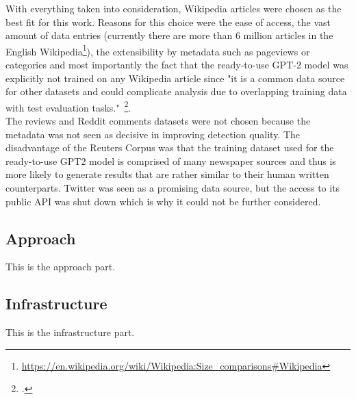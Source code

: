 With everything taken into consideration, Wikipedia articles were chosen as the best fit for this work. Reasons for this choice were the ease of access, the vast amount of data entries (currently there are more than 6 million articles in the English Wikipedia\footnote{\url{https://en.wikipedia.org/wiki/Wikipedia:Size_comparisons\#Wikipedia}}), the extensibility by metadata such as pageviews or categories and most importantly the fact that the ready-to-use GPT-2 model was explicitly not trained on any Wikipedia article since "it is a common data source for other datasets and could complicate analysis due to overlapping training data with test evaluation tasks."~\footcite{radford2019language}. \\
The reviews and Reddit comments datasets were not chosen because the metadata was not seen as decisive in improving detection quality. The disadvantage of the Reuters Corpus was that the training dataset used for the ready-to-use GPT2 model is comprised of many newspaper sources and thus is more likely to generate results that are rather similar to their human written counterparts. Twitter was seen as a promising data source, but the access to its public API was shut down which is why it could not be further considered.







\subsection{Approach}
\label{sec:approach}





This is the approach part.

\subsection{Infrastructure}
\label{sec:infrastructure}

This is the infrastructure part.